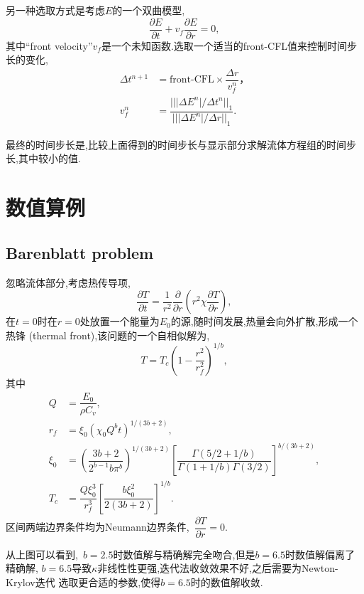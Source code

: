 \documentclass[a4paper, 11pt]{ctexart}
\numberwithin{equation}{section}
\numberwithin{figure}{section}
\newcommand\pd[2]{\dfrac{\partial {#1}}{\partial {#2}}}
\newcommand\abs[1]{\lvert #1 \rvert}
\newcommand\norm[1]{\lvert\lvert #1 \rvert\rvert}
\begin{document}
另一种选取方式是考虑$E$的一个双曲模型,
\begin{equation}
  \pd{E}{t}+v_f\pd{E}{r}=0,
\end{equation}
其中``front velocity''$v_f$是一个未知函数.选取一个适当的front-CFL值来控制时间步
长的变化,
\begin{align}
  \Delta t^{n+1}&=\text{front-CFL}\times \dfrac{\Delta r}{v_f^n}，\\
  v^n_f&=\dfrac{\norm{\abs{\Delta E^n}/\Delta t^n}_1}{\norm{\abs{\Delta E^n}/\Delta r}_1}.
\end{align}

最终的时间步长是,比较上面得到的时间步长与显示部分求解流体方程组的时间步长,其中较小的值.

\section{数值算例}
\subsection{Barenblatt problem}
忽略流体部分,考虑热传导项,
\begin{equation}
  \pd{T}{t}=\dfrac{1}{r^2}\pd{}{r}\left(r^2\chi\pd{T}{r}\right),
\end{equation}
在$t=0$时在$r=0$处放置一个能量为$E_0$的源,随时间发展,热量会向外扩散,形成一个热锋
(thermal front),该问题的一个自相似解为,
\begin{equation}
  T=T_c\left(1-\dfrac{r^2}{r^2_f}\right)^{1/b},
\end{equation}
其中
\begin{align*}
  Q&=\dfrac{E_0}{\rho C_v},\\
  r_f&=\xi_0(\chi_0 Q^bt)^{1/(3b+2)},\\
  \xi_0&=\left(\dfrac{3b+2}{2^{b-1}b\pi^b}\right)^{1/(3b+2)}\left[\dfrac{\Gamma(5/2+1/b)}{\Gamma(1+1/b)\Gamma(3/2)}\right]^{b/(3b+2)},\\
  T_c&=\dfrac{Q\xi_0^3}{r_f^3}\left[\dfrac{b\xi_0^2}{2(3b+2)}\right]^{1/b}.
\end{align*}
区间两端边界条件均为Neumann边界条件,~$\pd{T}{r}=0$.

\begin{figure}[H]
  \centering
\end{figure}
从上图可以看到,~$b=2.5$时数值解与精确解完全吻合,但是$b=6.5$时数值解偏离了精确解,
$b=6.5$导致$\kappa$非线性性更强,迭代法收敛效果不好,之后需要为Newton-Krylov迭代
选取更合适的参数,使得$b=6.5$时的数值解收敛.
\end{document}
